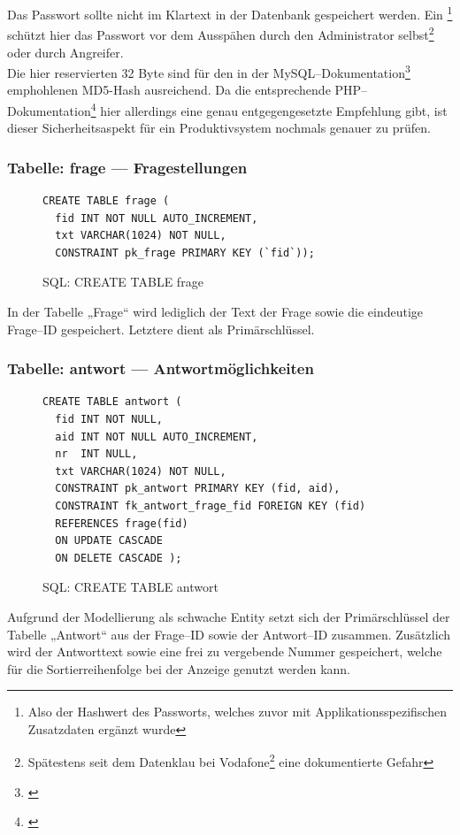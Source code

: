 Das Passwort sollte nicht im Klartext in der Datenbank gespeichert werden. Ein \footnote{Also der Hashwert des Passworts, welches zuvor mit Applikationsspezifischen Zusatzdaten ergänzt wurde} schützt hier das Passwort vor dem Ausspähen durch den Administrator selbst\footnote{Spätestens seit dem Datenklau bei Vodafone\footnote{\cite{vodafone}} eine dokumentierte Gefahr} oder durch Angreifer.\\
Die hier reservierten 32 Byte sind für den in der MySQL--Dokumentation\footnote{\cite{mysql:md5}} emphohlenen MD5-Hash ausreichend. Da die entsprechende PHP--Dokumentation\footnote{\cite{php:md5}} hier allerdings eine genau entgegengesetzte Empfehlung gibt, ist dieser Sicherheitsaspekt für ein Produktivsystem nochmals genauer zu prüfen.

\subsubsection{Tabelle: frage --- Fragestellungen}
\begin{figure}[H]
\begin{verbatim}
CREATE TABLE frage (
  fid INT NOT NULL AUTO_INCREMENT,
  txt VARCHAR(1024) NOT NULL,
  CONSTRAINT pk_frage PRIMARY KEY (`fid`));
\end{verbatim}
\caption{SQL: CREATE TABLE frage}
\label{sql:tblfrage}
\end{figure}

In der Tabelle „Frage“ wird lediglich der Text der Frage sowie die eindeutige Frage--ID gespeichert. Letztere dient als Primärschlüssel.

\subsubsection{Tabelle: antwort --- Antwortmöglichkeiten}
\begin{figure}[H]
\begin{verbatim}
CREATE TABLE antwort (
  fid INT NOT NULL, 
  aid INT NOT NULL AUTO_INCREMENT,
  nr  INT NULL,
  txt VARCHAR(1024) NOT NULL,
  CONSTRAINT pk_antwort PRIMARY KEY (fid, aid),
  CONSTRAINT fk_antwort_frage_fid FOREIGN KEY (fid) 
  REFERENCES frage(fid) 
  ON UPDATE CASCADE 
  ON DELETE CASCADE );
\end{verbatim}
\caption{SQL: CREATE TABLE antwort}
\label{sql:tblantwort}
\end{figure}

Aufgrund der Modellierung als schwache Entity setzt sich der Primärschlüssel der Tabelle „Antwort“ aus der Frage--ID sowie der Antwort--ID zusammen. Zusätzlich wird der Antworttext sowie eine frei zu vergebende Nummer gespeichert, welche für die Sortierreihenfolge bei der Anzeige genutzt werden kann.

